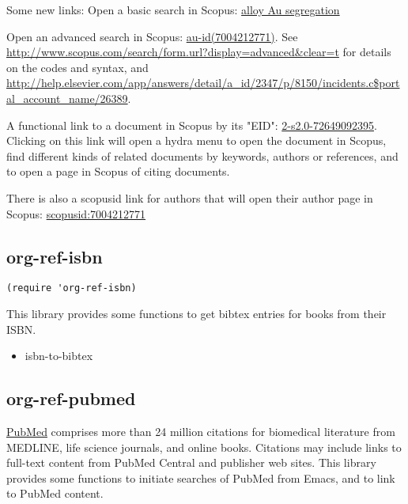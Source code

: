 \documentclass[11pt]{article}
\begin{document}
{Some new links:
Open a basic search in Scopus: \href{http://www.scopus.com/results/results.url?sort=plf-f&src=s&sot=b&sdt=b&sl=35&s=TITLE-ABS-KEY%28alloy%20Au%20segregation%29&origin=searchbasic}{alloy Au segregation}

Open an advanced search in Scopus: \href{http://www.scopus.com/results/results.url?sort=plf-f&src=s&sot=a&sdt=a&sl=21&s=au-id%287004212771%29&origin=searchadvanced}{au-id(7004212771)}. See \url{http://www.scopus.com/search/form.url?display=advanced&clear=t} for details on the codes and syntax, and \url{http://help.elsevier.com/app/answers/detail/a_id/2347/p/8150/incidents.c$portal_account_name/26389}.

A functional link to a document in Scopus by its "EID": \href{http://www.scopus.com/record/display.url?eid=2-s2.0-72649092395&origin=resultslist}{2-s2.0-72649092395}. Clicking on this link will open a hydra menu to open the document in Scopus, find different kinds of related documents by keywords, authors or references, and to open a page in Scopus of citing documents.

There is also a scopusid link for authors that will open their author page in Scopus: \href{http://www.scopus.com/authid/detail.url?origin=AuthorProfile&authorId=7004212771}{scopusid:7004212771}

\subsection{org-ref-isbn}
\label{sec:orgheadline22}

\begin{verbatim}
(require 'org-ref-isbn)
\end{verbatim}

This library provides some functions to get bibtex entries for books from their ISBN.

\begin{itemize}
\item isbn-to-bibtex
\end{itemize}

\subsection{org-ref-pubmed}
\label{sec:orgheadline23}

\href{http://www.ncbi.nlm.nih.gov/pubmed}{PubMed} comprises more than 24 million citations for biomedical literature from MEDLINE, life science journals, and online books. Citations may include links to full-text content from PubMed Central and publisher web sites. This library provides some functions to initiate searches of PubMed from Emacs, and to link to PubMed content.

}
\end{document}
